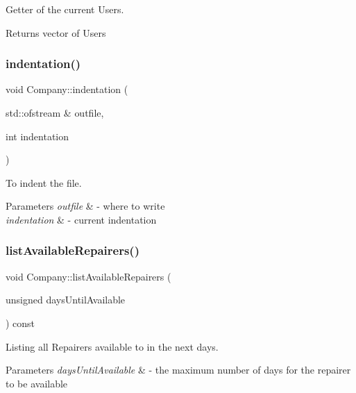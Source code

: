Getter of the current Users. 

\begin{DoxyReturn}{Returns}
vector of Users 
\end{DoxyReturn}
\mbox{\label{class_company_aa8b5bbb3b2d49d13f36d4fcdfc0d20d1}} 
\subsubsection{\texorpdfstring{indentation()}{indentation()}}
{\footnotesize\ttfamily void Company\+::indentation (\begin{DoxyParamCaption}\item[{std\+::ofstream \&}]{outfile,  }\item[{int}]{indentation }\end{DoxyParamCaption})}



To indent the file. 


\begin{DoxyParams}{Parameters}
{\em outfile} & -\/ where to write \\
\hline
{\em indentation} & -\/ current indentation \\
\hline
\end{DoxyParams}
\mbox{\label{class_company_a12366416c26ae1d5046695261374f440}} 
\subsubsection{\texorpdfstring{list\+Available\+Repairers()}{listAvailableRepairers()}}
{\footnotesize\ttfamily void Company\+::list\+Available\+Repairers (\begin{DoxyParamCaption}\item[{unsigned}]{days\+Until\+Available }\end{DoxyParamCaption}) const}



Listing all Repairers available to in the next days. 


\begin{DoxyParams}{Parameters}
{\em days\+Until\+Available} & -\/ the maximum number of days for the repairer to be available \\
\hline
\end{DoxyParams}
\mbox{\label{class_company_a56fa75dd66690eae0853a3f3278220e3}} 
